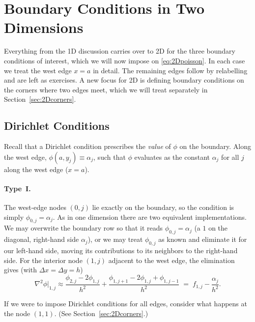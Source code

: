 \section{Boundary Conditions in Two Dimensions}
\label{sec:2Dbcs}

Everything from the 1D discussion carries over to 2D for the three boundary conditions of interest, which we will now impose on
\eqref{eq:2Dpoisson}. In each case we treat the west
edge $x=a$ in detail. The
remaining edges follow by relabelling and are left as exercises. A new focus for 2D is defining boundary conditions on the corners
where two edges meet, which we will treat separately in Section~\ref{sec:2Dcorners}.


\subsection{Dirichlet Conditions}
\label{sec:2Ddirichlet}

Recall that a Dirichlet condition prescribes the \emph{value} of $\phi$ on the boundary.
Along the west edge, $\phi(a,y_j) \equiv \alpha_j$, such that $\phi$ evaluates as the constant $\alpha_j$ for all $j$ along the west edge ($x = a$).
\paragraph{Type~I.}
The west-edge nodes $(0,j)$ lie exactly on the boundary, so the condition is simply $\phi_{0,j}=\alpha_j$. As in one dimension there are two
equivalent implementations. We may overwrite the boundary row so that it reads
$\phi_{0,j}=\alpha_j$ (a $1$ on the diagonal, right-hand side $\alpha_j$), or
we may treat $\phi_{0,j}$ as known and eliminate it for our left-hand side, moving its
contributions to its neighbors to the right-hand side. For the interior node
$(1,j)$ adjacent to the west edge, the elimination gives (with
$\Delta x=\Delta y=h$)
\begin{equation}
    \nabla^2\phi\big|_{1,j}
\approx 
    \frac{\phi_{2,j}-2\phi_{1,j}}{h^2}+\frac{\phi_{1,j+1}-2\phi_{1,j}+\phi_{1,j-1}}{h^2}
    \;=\; f_{1,j}-\frac{\alpha_j}{h^2}.
    \label{eq:2Ddir-typeI}
\end{equation}


If we were to impose Dirichlet conditions for all edges, consider what happens at the node
$(1,1)$. (See
Section~\ref{sec:2Dcorners}.)


